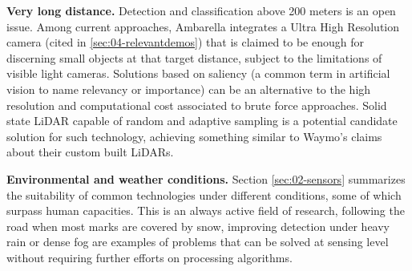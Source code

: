 \textbf{Very long distance.} 
    Detection and classification above 200 meters is an open issue. 
    Among current approaches, Ambarella integrates a Ultra High Resolution 
    camera (cited in \ref{sec:04-relevantdemos}) that is claimed to be enough
    for discerning small objects at that target distance, subject to the 
    limitations of visible light cameras.    
    Solutions based on saliency (a common term in artificial vision 
    \cite{Zhang2016a,Palazzi2018,Duthon2016} to name relevancy or importance) 
    can be an alternative to the high resolution and computational cost 
    associated to brute force approaches. Solid state LiDAR capable of
    random and adaptive sampling is a potential candidate solution for such 
    technology, achieving something similar to Waymo's claims about their custom
    built LiDARs.

\textbf{Environmental and weather conditions.}    
    Section \ref{sec:02-sensors} summarizes the suitability of common 
    technologies under different conditions, some of which surpass human 
    capacities. 
    This is an always active field of research, following the road  when
    most marks are covered by snow, improving detection under heavy rain 
    or dense fog are examples of problems that can be solved at sensing
    level without requiring further efforts on processing algorithms.
        
%                
    
